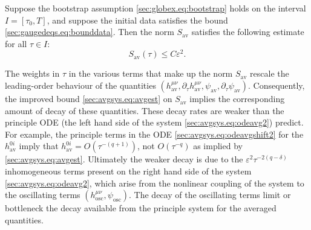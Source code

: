 \documentclass[10pt,a4paper]{amsart}
\newcommand{\av}{\mathrm{av}}
\newcommand{\osc}{\mathrm{osc}}
\newcommand{\pa}{\partial}
\newcommand{\ve}{\varepsilon}
\begin{document}
\begin{proposition}\label{sec:avgsys.prop:avgest}
    Suppose the bootstrap assumption \eqref{sec:globex.eq:bootstrap} holds on the interval $I = [\tau_0,T]$, and suppose the initial data satisfies the bound \eqref{sec:gaugedeqs.eq:bounddata}. Then the norm $S_{\av}$ satisfies the following estimate for all $\tau \in I$:
    \begin{equation}\label{sec:avgsys.eq:avgest}
        S_{\av}(\tau) \leq C\ve^2.
    \end{equation}
\end{proposition}

\begin{remark}\label{sec:avgsys.rmk:bottleneck}
    The weights in $\tau$ in the various terms that make up the norm $S_{\av}$ rescale the leading-order behaviour of the quantities $(h_{\av}^{\mu\nu},\pa_\tau h_{\av}^{\mu\nu},\psi_{\av},\pa_\tau \psi_{\av})$. Consequently, the improved bound \eqref{sec:avgsys.eq:avgest} on $S_{\av}$ implies the corresponding amount of decay of these quantities. These decay rates are weaker than the principle ODE (the left hand side of the system \eqref{sec:avgsys.eq:odeavg2}) predict. For example, the principle terms in the ODE \eqref{sec:avgsys.eq:odeavgshift2} for the $h_{\av}^{0i}$ imply that $h_{\av}^{0i} = O(\tau^{-(q+1)})$, not $O(\tau^{-q})$ as implied by \eqref{sec:avgsys.eq:avgest}. Ultimately the weaker decay is due to the $\ve^2 \tau^{-2(q-\delta)}$ inhomogeneous terms present on the right hand side of the system \eqref{sec:avgsys.eq:odeavg2}, which arise from the nonlinear coupling of the system to the oscillating terms $(h_{\osc}^{\mu\nu},\psi_{\osc})$. The decay of the oscillating terms limit or bottleneck the decay available from the principle system for the averaged quantities.
\end{remark}
\end{document}

